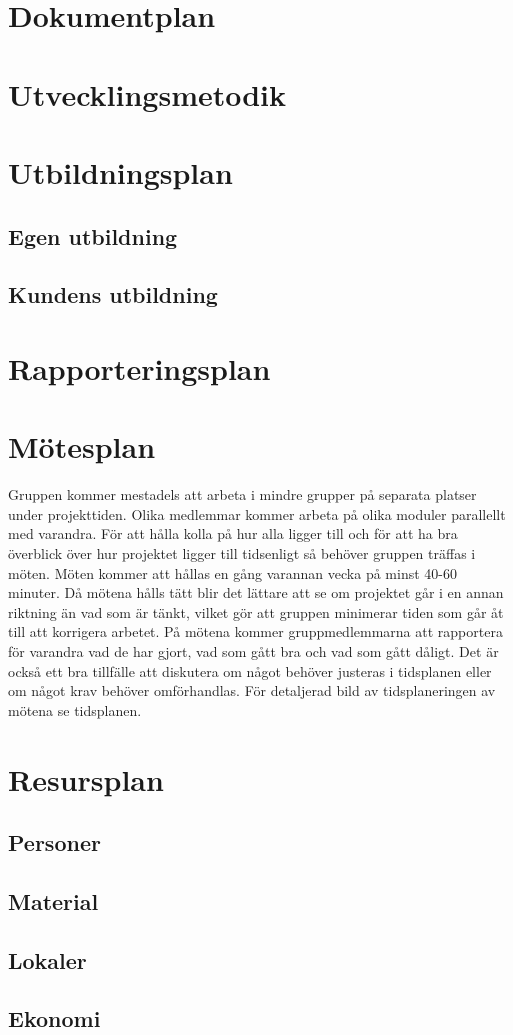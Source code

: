 \documentclass[projektplan/plan.tex]{subfiles}
\begin{document}
\section{Dokumentplan}

\section{Utvecklingsmetodik}


\section{Utbildningsplan}
\subsection{Egen utbildning}
\subsection{Kundens utbildning}

\section{Rapporteringsplan}
\section{Mötesplan}
Gruppen kommer mestadels att arbeta i mindre grupper på separata platser under projekttiden. Olika medlemmar kommer arbeta på olika moduler parallellt med varandra. För att hålla kolla på hur alla ligger till och för att ha bra överblick över hur projektet ligger till tidsenligt så behöver gruppen träffas i möten. Möten kommer att hållas en gång varannan vecka på minst 40-60 minuter. Då mötena hålls tätt blir det lättare att se om projektet går i en annan riktning än vad som är tänkt, vilket gör att gruppen minimerar tiden som går åt till att korrigera arbetet. På mötena kommer gruppmedlemmarna att rapportera för varandra vad de har gjort, vad som gått bra och vad som gått dåligt. Det är också ett bra tillfälle att diskutera om något behöver justeras i tidsplanen eller om något krav behöver omförhandlas. För detaljerad bild av tidsplaneringen av mötena se tidsplanen.
\section{Resursplan}
\subsection{Personer}
\subsection{Material}
\subsection{Lokaler}
\subsection{Ekonomi}
\end{document}
